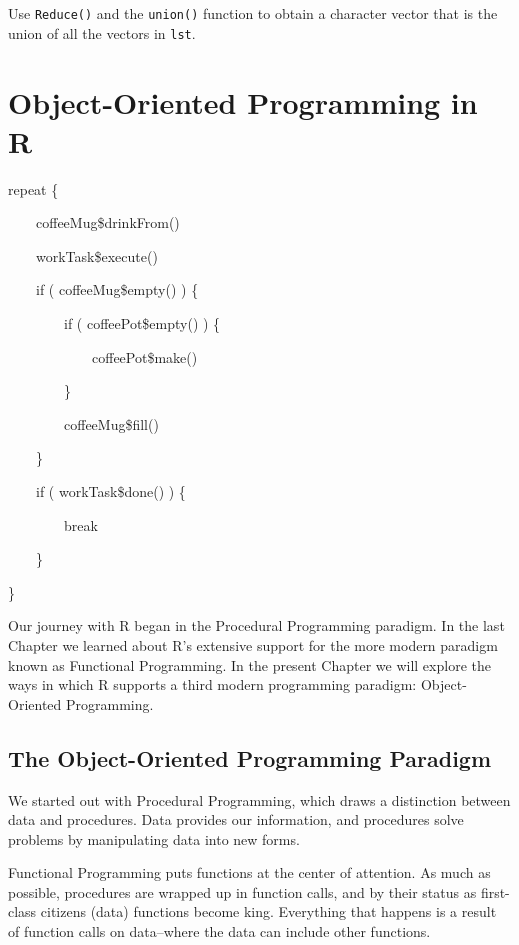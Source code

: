 \documentclass[]{book}
\theoremstyle{definition}
\theoremstyle{definition}
\theoremstyle{definition}
\theoremstyle{remark}
\let\BeginKnitrBlock\begin \let\EndKnitrBlock\end
\begin{document}
{\begin{enumerate}
  Use \texttt{Reduce()} and the \texttt{union()} function to obtain a
  character vector that is the union of all the vectors in \texttt{lst}.
\end{enumerate}

\chapter{Object-Oriented Programming in R}\label{oo}

\BeginKnitrBlock{leadquote}
repeat \{

~~~~coffeeMug\$drinkFrom()

~~~~workTask\$execute()

~~~~if ( coffeeMug\$empty() ) \{

~~~~~~~~if ( coffeePot\$empty() ) \{

~~~~~~~~~~~~coffeePot\$make()

~~~~~~~~\}

~~~~~~~~coffeeMug\$fill()

~~~~\}

~~~~if ( workTask\$done() ) \{

~~~~~~~~break

~~~~\}

\}
\EndKnitrBlock{leadquote}

Our journey with R began in the Procedural Programming paradigm. In the
last Chapter we learned about R's extensive support for the more modern
paradigm known as Functional Programming. In the present Chapter we will
explore the ways in which R supports a third modern programming
paradigm: Object-Oriented Programming.

\newpage

\section{The Object-Oriented Programming
Paradigm}\label{the-object-oriented-programming-paradigm}

We started out with Procedural Programming, which draws a distinction
between data and procedures. Data provides our information, and
procedures solve problems by manipulating data into new forms.

Functional Programming puts functions at the center of attention.
 As much as possible, procedures are
wrapped up in function calls, and by their status as first-class
citizens (data) functions become king. Everything that happens is a
result of function calls on data--where the data can include other
functions.

}
\end{document}
